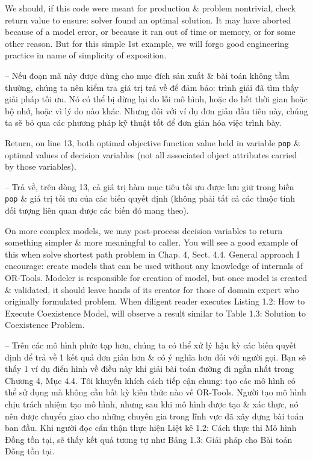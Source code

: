 \documentclass{article}
\begin{document}
\begin{itemize}
\begin{itemize}
        We should, if this code were meant for production \& problem nontrivial, check return value to ensure: solver found an optimal solution. It may have aborted because of a model error, or because it ran out of time or memory, or for some other reason. But for this simple 1st example, we will forgo good engineering practice in name of simplicity of exposition.

        -- Nếu đoạn mã này được dùng cho mục đích sản xuất \& bài toán không tầm thường, chúng ta nên kiểm tra giá trị trả về để đảm bảo: trình giải đã tìm thấy giải pháp tối ưu. Nó có thể bị dừng lại do lỗi mô hình, hoặc do hết thời gian hoặc bộ nhớ, hoặc vì lý do nào khác. Nhưng đối với ví dụ đơn giản đầu tiên này, chúng ta sẽ bỏ qua các phương pháp kỹ thuật tốt để đơn giản hóa việc trình bày.

        Return, on line 13, both optimal objective function value held in variable {\tt pop} \& optimal values of decision variables (not all associated object attributes carried by those variables).

        -- Trả về, trên dòng 13, cả giá trị hàm mục tiêu tối ưu được lưu giữ trong biến {\tt pop} \& giá trị tối ưu của các biến quyết định (không phải tất cả các thuộc tính đối tượng liên quan được các biến đó mang theo).

        On more complex models, we may post-process decision variables to return something simpler \& more meaningful to caller. You will see a good example of this when solve shortest path problem in Chap. 4, Sect. 4.4. General approach I encourage: create models that can be used without any knowledge of internals of OR-Tools. Modeler is responsible for creation of model, but once model is created \& validated, it should leave hands of its creator for those of domain expert who originally formulated problem. When diligent reader executes {\sf Listing 1.2: How to Execute Coexistence Model}, will observe a result similar to {\sf Table 1.3: Solution to Coexistence Problem}.

        -- Trên các mô hình phức tạp hơn, chúng ta có thể xử lý hậu kỳ các biến quyết định để trả về 1 kết quả đơn giản hơn \& có ý nghĩa hơn đối với người gọi. Bạn sẽ thấy 1 ví dụ điển hình về điều này khi giải bài toán đường đi ngắn nhất trong Chương 4, Mục 4.4. Tôi khuyến khích cách tiếp cận chung: tạo các mô hình có thể sử dụng mà không cần bất kỳ kiến thức nào về OR-Tools. Người tạo mô hình chịu trách nhiệm tạo mô hình, nhưng sau khi mô hình được tạo \& xác thực, nó nên được chuyển giao cho những chuyên gia trong lĩnh vực đã xây dựng bài toán ban đầu. Khi người đọc cẩn thận thực hiện {\sf Liệt kê 1.2: Cách thực thi Mô hình Đồng tồn tại}, sẽ thấy kết quả tương tự như {\sf Bảng 1.3: Giải pháp cho Bài toán Đồng tồn tại}.


\end{itemize}
\end{itemize}
\end{document}

